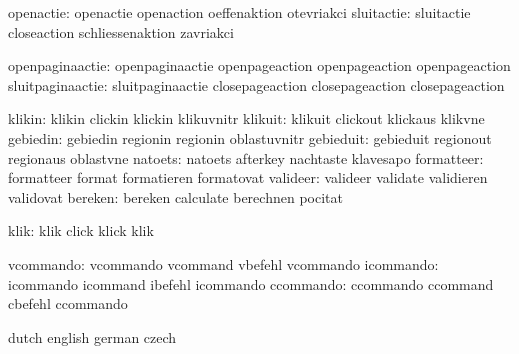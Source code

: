            openactie:  openactie            openaction           oeffenaktion
                       otevriakci
          sluitactie:  sluitactie           closeaction          schliessenaktion
                       zavriakci

     openpaginaactie:  openpaginaactie      openpageaction       openpageaction       
                       openpageaction  %
    sluitpaginaactie:  sluitpaginaactie     closepageaction      closepageaction      
                       closepageaction %

              klikin:  klikin               clickin              klickin
                       klikuvnitr
             klikuit:  klikuit              clickout             klickaus
                       klikvne
            gebiedin:  gebiedin             regionin             regionin
                       oblastuvnitr
           gebieduit:  gebieduit            regionout            regionaus
                       oblastvne
             natoets:  natoets              afterkey             nachtaste
                       klavesapo
          formatteer:  formatteer           format               formatieren
                       formatovat
            valideer:  valideer             validate             validieren
                       validovat
             bereken:  bereken              calculate            berechnen
                       pocitat

                klik:  klik                 click                klick  
                       klik %

           vcommando:  vcommando            vcommand             vbefehl
                       vcommando %
           icommando:  icommando            icommand             ibefehl
                       icommando %
           ccommando:  ccommando            ccommand             cbefehl
                       ccommando %

\stopconstants




\startvariables       dutch                english             german
                      czech

